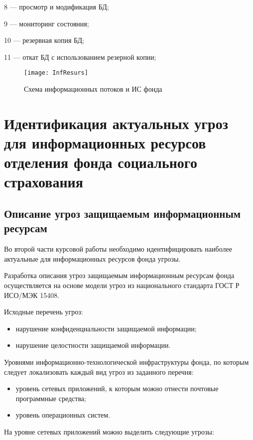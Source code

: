 8 --- просмотр и модификация БД;

9 --- мониторинг состояния;

10 --- резервная копия БД;

11 --- откат БД с использованием резерной копии;

\begin{figure}[h]
  \centering
  \texttt{[image: InfResurs]}
  \caption{Схема информационных потоков и ИС фонда}
  \label{fig:infresurs}  
\end{figure}

\cleardoublepage

\section{Идентификация актуальных угроз для информационных ресурсов отделения фонда социального страхования}
\label{sec:2}

\subsection{Описание угроз защищаемым информационным ресурсам}

\point Во второй части курсовой работы необходимо идентифицировать наиболее
актуальные для информационных ресурсов фонда угрозы.

Разработка описания угроз защищаемым информационным ресурсам фонда
осуществляется на основе модели угроз из национального стандарта ГОСТ
Р ИСО/МЭК 15408.

\point Исходные перечень угроз:

\begin{itemize}
\item нарушение конфиденциальности защищаемой информации;
\item нарушение целостности защищаемой информации.
\end{itemize}

\point Уровнями информационно-технологической инфраструктуры фонда, по
которым следует локализовать каждый вид угроз из заданного перечня:

\begin{itemize}
\item уровень сетевых приложений, к которым можно отнести почтовые
  программные средства;
\item уровень операционных систем.
\end{itemize}

\point На уровне сетевых приложений можно выделить следующие угрозы:

